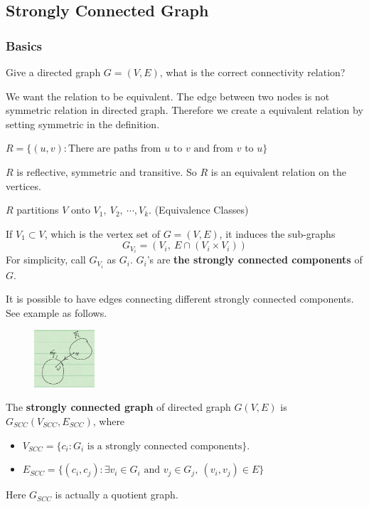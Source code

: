 \subsection{Strongly Connected Graph}

\subsubsection{Basics}
Give a directed graph $G = (V, E)$, what is the correct connectivity relation?

We want the relation to be equivalent. The edge between two nodes is not 
symmetric relation in directed graph. Therefore we create a equivalent relation 
by setting symmetric in the definition.

\begin{definition}
 $R = \{(u, v): \text{There are paths from $u$ to $v$ and from $v$ to $u$}\}$
\end{definition}

$R$ is reflective, symmetric and transitive. So $R$ is an equivalent relation 
on the vertices.

\begin{definition}
$R$ partitions $V$ onto $V_1,~V_2,~\cdots, V_k$. (Equivalence Classes)

If $V_1 \subset V$, which is the vertex set of $G = (V, E)$, it induces the 
sub-graphs
\[G_{V_i} = (V_i, ~E \cap (V_i \times V_i) )\]
For simplicity, call $G_{V_i}$ as $G_i$. $G_i$'s are \textbf{the 
strongly connected components} of $G$.
\end{definition}


It is possible to have edges connecting different strongly connected 
components. See example as follows.
\begin{figure}[H]
\centering
\includegraphics[width=0.2\textwidth]{edge-strongly-connected-components.png}
\end{figure}

\begin{definition}
 The \textbf{strongly connected graph} of directed graph $G(V, E)$ is 
$G_{SCC}(V_{SCC}, E_{SCC})$, where
\begin{itemize}
 \item $V_{SCC} = \{c_i: G_i \text{ is a strongly connected components}\}$.
 \item $E_{SCC} = \{(c_i, c_j): \exists v_i \in G_i \text{ and }v_j \in G_j, 
~(v_i, v_j) \in E \}$
\end{itemize}
\end{definition}
Here $G_{SCC}$ is actually a quotient graph.

